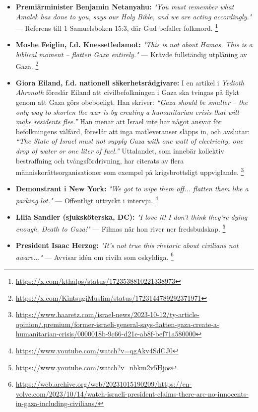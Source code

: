 \begin{itemize}
    \item \textbf{Premiärminister Benjamin Netanyahu:} \textit{"You must remember what Amalek has done to you, says our Holy Bible, and we are acting accordingly."} — Referens till 1 Samuelsboken 15:3, där Gud befaller folkmord. \footnote{\url{https://x.com/kthalps/status/1723538810221338973}}

    \item \textbf{Moshe Feiglin, f.d. Knessetledamot:} \textit{"This is not about Hamas. This is a biblical moment – flatten Gaza entirely."} — Krävde fullständig utplåning av Gaza. \footnote{\url{https://x.com/KintsugiMuslim/status/1723144789292371971}}

    \item \textbf{Giora Eiland, f.d. nationell säkerhetsrådgivare:} I en artikel i \textit{Yedioth Ahronoth} föreslår Eiland att civilbefolkningen i Gaza ska tvingas på flykt genom att Gaza görs obeboeligt. Han skriver: \textit{“Gaza should be smaller – the only way to shorten the war is by creating a humanitarian crisis that will make residents flee.”} Han menar att Israel inte har något ansvar för befolkningens välfärd, föreslår att inga matleveranser släpps in, och avslutar: \textit{“The State of Israel must not supply Gaza with one watt of electricity, one drop of water or one liter of fuel.”} Uttalandet, som innebär kollektiv bestraffning och tvångsfördrivning, har citerats av flera människorättsorganisationer som exempel på krigsbrottsligt uppviglande. \footnote{\url{https://www.haaretz.com/israel-news/2023-10-12/ty-article-opinion/.premium/former-israeli-general-says-flatten-gaza-create-a-humanitarian-crisis/0000018b-9c66-d21e-ab8f-bef71a580000}}


    \item \textbf{Demonstrant i New York:} \textit{"We got to wipe them off... flatten them like a parking lot."} — Offentligt uttryckt i intervju. \footnote{\url{https://www.youtube.com/watch?v=qgAkv4SdCJ0}}

    \item \textbf{Lilia Sandler (sjuksköterska, DC):} \textit{"I love it! I don’t think they’re dying enough. Death to Gaza!"} — Filmas när hon river ner fredsbudskap. \footnote{\url{https://www.youtube.com/watch?v=nbkm2v5Hjos}}

    \item \textbf{President Isaac Herzog:} \textit{"It’s not true this rhetoric about civilians not aware..."} — Avvisar idén om civila som oskyldiga. \footnote{\url{https://web.archive.org/web/20231015190209/https://en-volve.com/2023/10/14/watch-israeli-president-claims-there-are-no-innocents-in-gaza-including-civilians/}}


\end{itemize}
